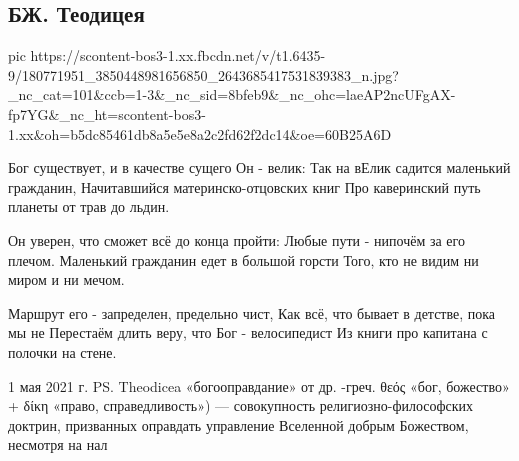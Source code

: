  
 
 
 
 
\subsection{БЖ. Теодицея}


\ifcmt
  pic https://scontent-bos3-1.xx.fbcdn.net/v/t1.6435-9/180771951_3850448981656850_2643685417531839383_n.jpg?_nc_cat=101&ccb=1-3&_nc_sid=8bfeb9&_nc_ohc=laeAP2ncUFgAX-fp7YG&_nc_ht=scontent-bos3-1.xx&oh=b5dc85461db8a5e5e8a2c2fd62f2dc14&oe=60B25A6D
\fi


Бог существует, и в качестве сущего Он - велик:
Так на вЕлик садится маленький гражданин,
Начитавшийся материнско-отцовских книг
Про каверинский путь планеты от трав до льдин.

Он уверен, что сможет всё до конца пройти:
Любые пути - нипочём за его плечом.
Маленький гражданин едет в большой горсти
Того, кто не видим ни миром и ни мечом.

Маршрут его - запределен, предельно чист,
Как всё, что бывает в детстве, пока мы не
Перестаём длить веру, что Бог - велосипедист
Из книги про капитана с полочки на стене.

1 мая 2021 г.
PS. Theodicea «богооправдание» от др. -греч. θεός «бог, божество» + δίκη «право, справедливость») — совокупность религиозно-философских доктрин, призванных оправдать управление Вселенной добрым Божеством, несмотря на нал


